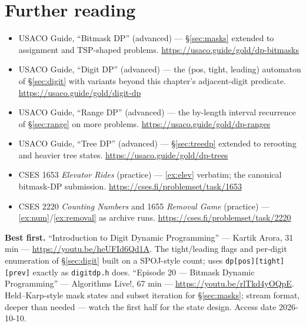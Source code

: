 \section*{Further reading}
\begin{itemize}
\item USACO Guide, ``Bitmask DP'' (advanced) --- \S\ref{sec:masks}
extended to assignment and TSP-shaped problems. \newline\url{https://usaco.guide/gold/dp-bitmasks}
\item USACO Guide, ``Digit DP'' (advanced) --- the (pos, tight,
leading) automaton of \S\ref{sec:digit} with variants beyond this
chapter's adjacent-digit predicate. \newline\url{https://usaco.guide/gold/digit-dp}
\item USACO Guide, ``Range DP'' (advanced) --- the by-length interval
recurrence of \S\ref{sec:range} on more problems. \newline\url{https://usaco.guide/gold/dp-ranges}
\item USACO Guide, ``Tree DP'' (advanced) --- \S\ref{sec:treedp}
extended to rerooting and heavier tree states. \newline\url{https://usaco.guide/gold/dp-trees}
\item CSES 1653 \emph{Elevator Rides} (practice) --- \ref{ex:elev}
verbatim; the canonical bitmask-DP submission. \newline\url{https://cses.fi/problemset/task/1653}
\item CSES 2220 \emph{Counting Numbers} and 1655 \emph{Removal Game}
(practice) ---
\ref{ex:num}/\ref{ex:removal} as archive runs. \newline\url{https://cses.fi/problemset/task/2220}\end{itemize}

\begin{rulebox}
\smallskip\noindent\textbf{Best first.}
``Introduction to Digit Dynamic Programming'' --- Kartik Arora,
31 min --- \url{https://youtu.be/heUFId6Qd1A}. The
tight/leading flags and per-digit enumeration of \S\ref{sec:digit}
built on a SPOJ-style count; uses \texttt{dp[pos][tight][prev]}
exactly as \texttt{digitdp.h} does.
\smallskip\noindent
``Episode 20 --- Bitmask Dynamic Programming'' --- Algorithms Live!,
67 min --- \url{https://youtu.be/rlTkd4yOQpE}.
Held--Karp-style mask states and subset iteration for
\S\ref{sec:masks}; stream format, deeper than needed --- watch the
first half for the state design. Access date 2026-10-10.
\end{rulebox}
